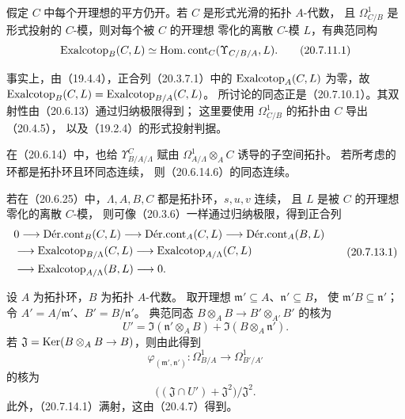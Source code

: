 假定 $C$ 中每个开理想的平方仍开。若 $C$ 是形式光滑的拓扑 $A$-代数，
且 $\Omega^1_{C/B}$ 是形式投射的 $C$-模，则对每个被 $C$ 的开理想
零化的离散 $C$-模 $L$，有典范同构
\begin{equation}
 \Exalcotop_B(C,L)\simeq\HomCont_C(\Upsilon_{C/B/A},L).
 \tag{20.7.11.1}
\end{equation}

事实上，由（19.4.4），正合列（20.3.7.1）中的
$\Exalcotop_A(C,L)$ 为零，故
$\Exalcotop_B(C,L)=\Exalcotop_{B/A}(C,L)$。
所讨论的同态正是（20.7.10.1）。其双射性由（20.6.13）通过归纳极限得到；
这里要使用 $\Omega^1_{C/B}$ 的拓扑由 $C$ 导出（20.4.5），
以及（19.2.4）的形式投射判据。

在（20.6.14）中，也给 $\Upsilon^C_{B/A/\Lambda}$ 赋由
$\Omega^1_{A/\Lambda}\otimes_A C$ 诱导的子空间拓扑。
若所考虑的环都是拓扑环且环同态连续，
则（20.6.14.6）的同态连续。

若在（20.6.25）中，$\Lambda,A,B,C$ 都是拓扑环，$s,u,v$ 连续，
且 $L$ 是被 $C$ 的开理想零化的离散 $C$-模，
则可像（20.3.6）一样通过归纳极限，得到正合列
\begin{equation}
\begin{aligned}
&0\longrightarrow\DerCont_B(C,L)\longrightarrow\DerCont_A(C,L)
 \longrightarrow\DerCont_A(B,L)\\
&\longrightarrow\Exalcotop_{B/\Lambda}(C,L)\longrightarrow
 \Exalcotop_{A/\Lambda}(C,L)\\
&\longrightarrow\Exalcotop_{A/\Lambda}(B,L)\longrightarrow0 .
\end{aligned}
\tag{20.7.13.1}
\end{equation}

设 $A$ 为拓扑环，$B$ 为拓扑 $A$-代数。
取开理想 $\mathfrak m'\subseteq A$、$\mathfrak n'\subseteq B$，
使 $\mathfrak m'B\subseteq\mathfrak n'$；令
$A'=A/\mathfrak m'$、$B'=B/\mathfrak n'$。
典范同态 $B\otimes_A B\to B'\otimes_{A'}B'$ 的核为
\[
 U'=\Im(\mathfrak n'\otimes_A B)+\Im(B\otimes_A\mathfrak n').
\]
若 $\mathfrak J=\Ker(B\otimes_A B\to B)$，则由此得到
\begin{equation}
 \varphi_{(\mathfrak m',\mathfrak n')}:
 \Omega^1_{B/A}\longrightarrow\Omega^1_{B'/A'}
 \tag{20.7.14.1}
\end{equation}
的核为
\[
 \bigl((\mathfrak J\cap U')+\mathfrak J^2\bigr)/\mathfrak J^2 .
\]
此外，（20.7.14.1）满射，这由（20.4.7）得到。

